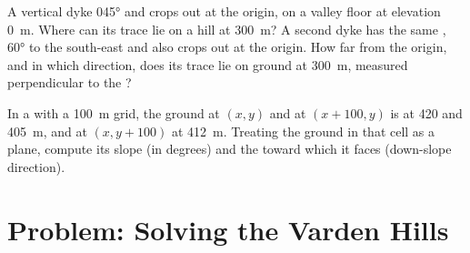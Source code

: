 \begin{exercise}[$\star\star\star$]\label{exo:b1:geological-maps:11}
A vertical dyke  \ang{045} and crops out at the origin, on a valley
floor at elevation \qty{0}{m}. Where can its trace lie on a hill at
\qty{300}{m}? A second dyke has the same ,  \ang{60} to the
south-east and also crops out at the origin. How far from the origin, and in
which direction, does its trace lie on ground at \qty{300}{m}, measured
perpendicular to the ?
\end{exercise}

\begin{exercise}[$\star\star\star$]\label{exo:b1:geological-maps:12}
In a  with a \qty{100}{m} grid, the ground at
$(x, y)$ and at $(x + 100, y)$ is at 420 and \qty{405}{m}, and at
$(x, y + 100)$ at \qty{412}{m}. Treating the ground in that cell as a plane,
compute its slope (in degrees) and the  toward which it faces
(down-slope direction).
\end{exercise}

\section{Problem: Solving the Varden Hills}


